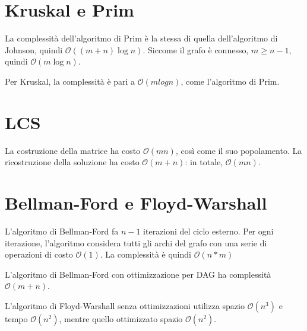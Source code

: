 \documentclass[11pt]{article}
\begin{document}
\section*{Kruskal e Prim}
La complessità dell'algoritmo di Prim è la stessa di quella dell'algoritmo di Johnson, quindi $\mathcal{O}((m+n)\log n)$. 
Siccome il grafo è connesso, $m\geq n-1$, quindi $\mathcal{O}(m\log n)$.

Per Kruskal, la complessità è pari a $\mathcal{O}(mlogn)$, come l'algoritmo di Prim.
\section*{LCS}
La costruzione della matrice ha costo $\mathcal{O}(mn)$, così come il suo popolamento. La ricostruzione della soluzione 
ha costo $\mathcal{O}(m+n)$: in totale, $\mathcal{O}(mn)$.
\section*{Bellman-Ford e Floyd-Warshall}
L'algoritmo di Bellman-Ford fa $n-1$ iterazioni del ciclo esterno. Per ogni iterazione, l'algoritmo considera tutti gli archi del grafo 
con una serie di operazioni di costo $\mathcal{O}(1)$. La complessità è quindi $\mathcal{O}(n*m)$

L'algoritmo di Bellman-Ford con ottimizzazione per DAG ha complessità $\mathcal{O}(m+n)$.

L'algoritmo di Floyd-Warshall senza ottimizzazioni utilizza spazio $\mathcal{O}(n^3)$ e tempo $\mathcal{O}(n^2)$, mentre 
quello ottimizzato spazio $\mathcal{O}(n^2)$.
\section*{}
\end{document}

